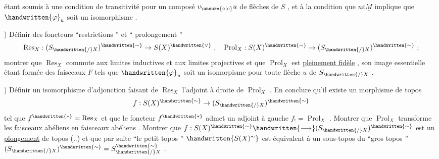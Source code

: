 étant soumis à une condition de transitivité pour un composé \(v_{\unsure{\circ|o}}u\) de flèches de \(S\) , et à la condition que \(u\varepsilon\underline{M}\) implique que \(\handwritten{\varphi}_u\) soit un isomorphisme .

) Définir des foncteurs ``restrictions '' et `` prolongement ''
\[
\operatorname{Res}_X:(S_{\handwritten{/}X})^{\handwritten{\sim}}\to S(X)^{\handwritten{\vee}}\ ,\quad
\operatorname{Prol}_X:S(X)^{\handwritten{\sim}}\to(S_{\handwritten{/}X})^{\handwritten{\sim}}\ ;
\]
montrer que \(\operatorname{Res}_X\) commute aux limites inductives et aux limites projectives et que \(\operatorname{Prol}_X\) est \uline{pleinement fidèle} , son image essentielle étant formée des faisceaux \(F\) tels que \(\handwritten{\varphi}_u\) soit un isomorpisme pour toute flèche \(u\) de  \(S_{\handwritten{/}X}\) .

) Définir un isomorphisme d'adjonction faisant de \(\operatorname{Res}_X\) l'adjoint à droite de \(\operatorname{Prol}_X\) . En conclure qu'il existe un morphisme de topos
\[
f:S(X)^{\handwritten{\sim}}\to(S_{\handwritten{/}X})^{\handwritten{\sim}}
\]
tel que \(f^{\handwritten{*}}=\operatorname{Res}_X\) et que le foncteur \(f^{\handwritten{*}}\) admet un adjoint à gauche \(f_!=\operatorname{Prol}_X\) . Montrer que \(\operatorname{Prol}_X\) transforme les faisceaux abéliens en faisceaux abéliens . Montrer que \(f:S(X)^{\handwritten{\sim}}\handwritten{\longrightarrow}(S_{\handwritten{/}X})^{\handwritten{\sim}}\) est un \uline{plongement} de topos (..) et que par suite ``le petit topos '' \(\handwritten{S(X)^{\sim}}\) est  équivalent à un sous-topos du ``gros topos '' \((S_{\handwritten{/}X})^{\handwritten{\sim}}=S^{\handwritten{\sim}}_{\handwritten{/}X}\) .

